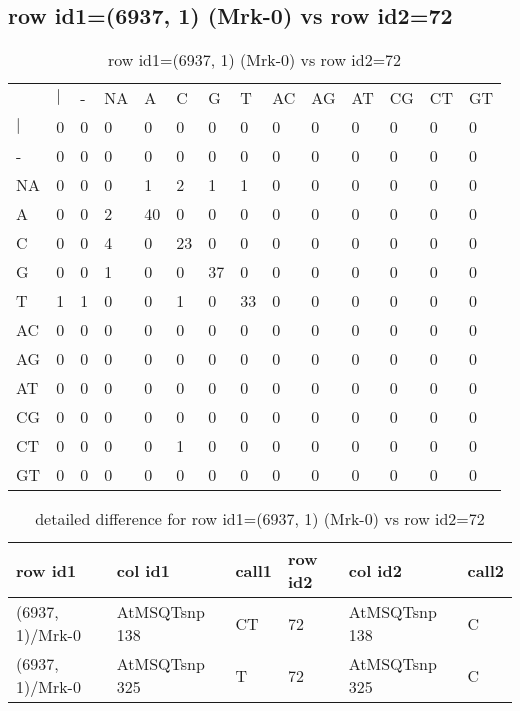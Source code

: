 \subsection{row id1=(6937, 1) (Mrk-0) vs row id2=72}
\begin{center}
\begin{longtable}{|l|l|l|l|l|l|l|l|l|l|l|l|l|l|}
\caption{row id1=(6937, 1) (Mrk-0) vs row id2=72} \label{table_dm136}\\
\hline
\\
\hline
&$|$&-&NA&A&C&G&T&AC&AG&AT&CG&CT&GT\\
$|$&0&0&0&0&0&0&0&0&0&0&0&0&0\\
-&0&0&0&0&0&0&0&0&0&0&0&0&0\\
NA&0&0&0&1&2&1&1&0&0&0&0&0&0\\
A&0&0&2&40&0&0&0&0&0&0&0&0&0\\
C&0&0&4&0&23&0&0&0&0&0&0&0&0\\
G&0&0&1&0&0&37&0&0&0&0&0&0&0\\
T&1&1&0&0&1&0&33&0&0&0&0&0&0\\
AC&0&0&0&0&0&0&0&0&0&0&0&0&0\\
AG&0&0&0&0&0&0&0&0&0&0&0&0&0\\
AT&0&0&0&0&0&0&0&0&0&0&0&0&0\\
CG&0&0&0&0&0&0&0&0&0&0&0&0&0\\
CT&0&0&0&0&1&0&0&0&0&0&0&0&0\\
GT&0&0&0&0&0&0&0&0&0&0&0&0&0\\
\hline
\end{longtable}
\end{center}

\begin{center}
\begin{longtable}{|l|l|l|l|l|l|}
\caption{detailed difference for row id1=(6937, 1) (Mrk-0) vs row id2=72} \label{table_dm137}\\
\hline
row id1&col id1&call1&row id2&col id2&call2\\
\hline
(6937, 1)/Mrk-0&AtMSQTsnp 138&CT&72&AtMSQTsnp 138&C\\
(6937, 1)/Mrk-0&AtMSQTsnp 325&T&72&AtMSQTsnp 325&C\\
\hline
\end{longtable}
\end{center}

